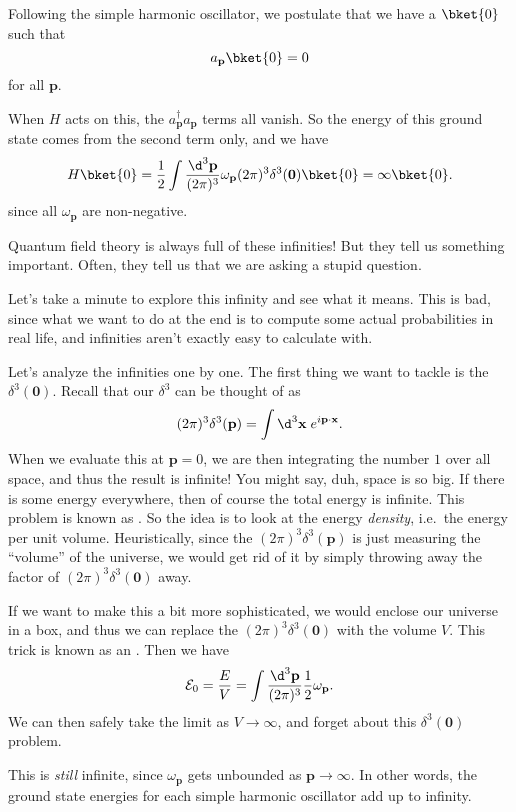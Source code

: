 \documentclass[a4paper]{article}
\begin{document}
Following the simple harmonic oscillator, we postulate that we have a  $\bket{0}$ such that
\[
  a_\mathbf{p} \bket{0} = 0
\]
for all $\mathbf{p}$.

When $H$ acts on this, the $a_\mathbf{p}^\dagger a_\mathbf{p}$ terms all vanish. So the energy of this ground state comes from the second term only, and we have
\[
  H\bket{0} = \frac{1}{2}\int \frac{\d^3 \mathbf{p}}{(2\pi)^3} \omega_\mathbf{p} (2\pi)^3 \delta^3(\mathbf{0}) \bket{0} = \infty\bket{0}.
\]
since all $\omega_\mathbf{p}$ are non-negative.

Quantum field theory is always full of these infinities! But they tell us something important. Often, they tell us that we are asking a stupid question.

Let's take a minute to explore this infinity and see what it means. This is bad, since what we want to do at the end is to compute some actual probabilities in real life, and infinities aren't exactly easy to calculate with.

Let's analyze the infinities one by one. The first thing we want to tackle is the $\delta^3(\mathbf{0})$. Recall that our $\delta^3$ can be thought of as
\[
  (2\pi)^3 \delta^3(\mathbf{p}) = \int \d^3 \mathbf{x}\; e^{i\mathbf{p}\cdot \mathbf{x}}.
\]
When we evaluate this at $\mathbf{p} = 0$, we are then integrating the number $1$ over all space, and thus the result is infinite! You might say, duh, space is so big. If there is some energy everywhere, then of course the total energy is infinite. This problem is known as . So the idea is to look at the energy \emph{density}, i.e.\ the energy per unit volume. Heuristically, since the $(2\pi)^3\delta^3(\mathbf{p})$ is just measuring the ``volume'' of the universe, we would get rid of it by simply throwing away the factor of $(2\pi)^3 \delta^3(\mathbf{0})$ away.

If we want to make this a bit more sophisticated, we would enclose our universe in a box, and thus we can replace the $(2\pi)^3\delta^3(\mathbf{0})$ with the volume $V$. This trick is known as an . Then we have
\[
  \mathcal{E}_0 = \frac{E}{V} = \int \frac{\d^3 \mathbf{p}}{(2\pi)^3} \frac{1}{2} \omega_\mathbf{p}.
\]
We can then safely take the limit as $V \to \infty$, and forget about this $\delta^3(\mathbf{0})$ problem.

This is \emph{still} infinite, since $\omega_\mathbf{p}$ gets unbounded as $\mathbf{p} \to \infty$. In other words, the ground state energies for each simple harmonic oscillator add up to infinity.
\end{document}
